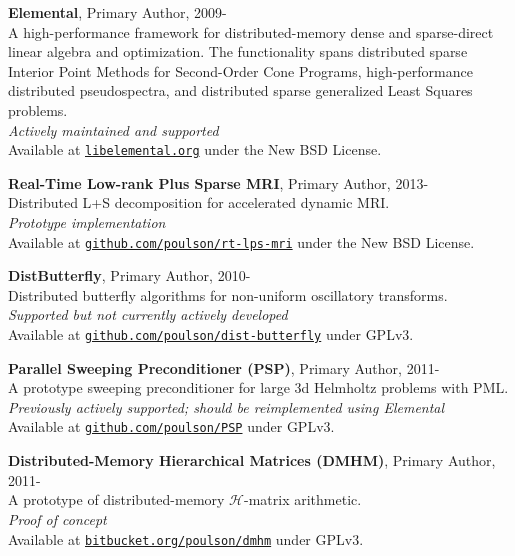 \documentclass[letterpaper]{article}
\renewenvironment{itemize}{
  \begin{list}{}{
    \setlength{\leftmargin}{1.5em}
  }
}{
  \end{list}
}
\begin{document}
\begin{itemize}
\item {\bf Elemental}, Primary Author, 2009-\\
A high-performance framework for distributed-memory dense and sparse-direct linear algebra and optimization. The functionality spans distributed sparse Interior Point Methods for Second-Order Cone Programs, high-performance distributed 
pseudospectra, and distributed sparse generalized Least Squares problems. \\ 
{\it Actively maintained and supported}\\
Available at 
\href{http://libelemental.org}{\tt libelemental.org} under the New BSD License.

\item {\bf Real-Time Low-rank Plus Sparse MRI}, Primary Author, 2013-\\
Distributed L+S decomposition for accelerated dynamic MRI.\\ 
{\it Prototype implementation}\\
Available at
\href{https://github.com/poulson/rt-lps-mri}{\tt github.com/poulson/rt-lps-mri} 
under the New BSD License.

\item {\bf DistButterfly}, Primary Author, 2010-\\
Distributed butterfly algorithms for non-uniform oscillatory transforms.\\
{\it Supported but not currently actively developed}\\
Available at
\href{https://github.com/poulson/dist-butterfly}{\tt github.com/poulson/dist-butterfly}
 under GPLv3.

\item {\bf Parallel Sweeping Preconditioner (PSP)}, Primary Author, 2011-\\
A prototype sweeping preconditioner for large 3d Helmholtz problems with  PML.\\
{\it Previously actively supported; should be reimplemented using Elemental}\\
Available at
\href{https://github.com/poulson/PSP}{\tt github.com/poulson/PSP} under GPLv3.

\item {\bf Distributed-Memory Hierarchical Matrices (DMHM)}, Primary Author, 2011-\\
A prototype of distributed-memory $\mathcal{H}$-matrix arithmetic. \\
{\it Proof of concept}\\
Available at
\href{https://bitbucket.org/poulson/dmhm}{\tt bitbucket.org/poulson/dmhm} under GPLv3.


\end{itemize}
\end{document}
